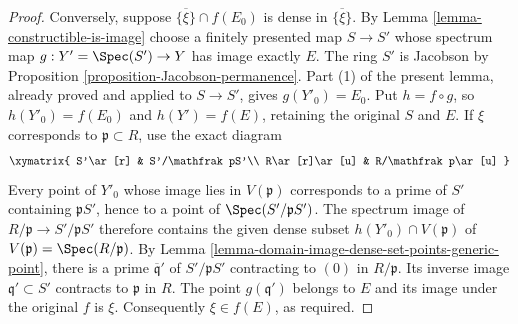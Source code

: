 \begin{proof}
\medskip\noindent
Conversely, suppose $\overline{\{\xi\}}\cap f(E_0)$ is dense
in $\overline{\{\xi\}}$. By Lemma \ref{lemma-constructible-is-image}
choose a finitely presented map $S\to S'$ whose spectrum map
$g:Y'=\Spec(S')\to Y$ has image exactly $E$.
The ring $S'$ is Jacobson by Proposition \ref{proposition-Jacobson-permanence}.
Part (1) of the present lemma, already proved and applied to $S\to S'$,
gives $g(Y'_0)=E_0$. Put $h=f\circ g$, so
$h(Y'_0)=f(E_0)$ and $h(Y')=f(E)$, retaining the original $S$ and $E$.
If $\xi$ corresponds to $\mathfrak p\subset R$, use the exact diagram
$$
\xymatrix{
S'\ar[r] & S'/\mathfrak pS'\\
R\ar[r]\ar[u] & R/\mathfrak p\ar[u]
}
$$
Every point of $Y'_0$ whose image lies in $V(\mathfrak p)$ corresponds
to a prime of $S'$ containing $\mathfrak pS'$, hence to a point of
$\Spec(S'/\mathfrak pS')$. The spectrum image of
$R/\mathfrak p\to S'/\mathfrak pS'$ therefore contains the given
dense subset $h(Y'_0)\cap V(\mathfrak p)$ of
$V(\mathfrak p)=\Spec(R/\mathfrak p)$.
By Lemma \ref{lemma-domain-image-dense-set-points-generic-point},
there is a prime $\overline{\mathfrak q}'$ of $S'/\mathfrak pS'$
contracting to $(0)$ in $R/\mathfrak p$. Its inverse image
$\mathfrak q'\subset S'$ contracts to $\mathfrak p$ in $R$.
The point $g(\mathfrak q')$ belongs to $E$ and its image under the
original $f$ is $\xi$. Consequently $\xi\in f(E)$, as required.
\end{proof}